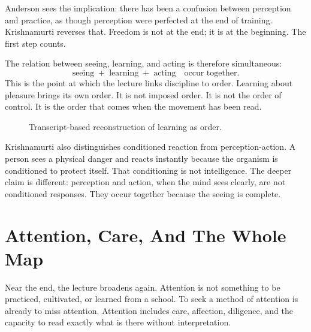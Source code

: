 Anderson sees the implication: there has been a confusion between perception and practice, as though perception were perfected at the end of training. Krishnamurti reverses that. Freedom is not at the end; it is at the beginning. The first step counts.

The relation between seeing, learning, and acting is therefore simultaneous:
\begin{equation}
\text{seeing} \;+\; \text{learning} \;+\; \text{acting}
\quad \text{occur together}.
\end{equation}
This is the point at which the lecture links discipline to order. Learning about pleasure brings its own order. It is not imposed order. It is not the order of control. It is the order that comes when the movement has been read.

\begin{figure}
\centering
{}

Transcript-based reconstruction of learning as order.
\end{figure}

Krishnamurti also distinguishes conditioned reaction from perception-action. A person sees a physical danger and reacts instantly because the organism is conditioned to protect itself. That conditioning is not intelligence. The deeper claim is different: perception and action, when the mind sees clearly, are not conditioned responses. They occur together because the seeing is complete.

\section{Attention, Care, And The Whole Map}

Near the end, the lecture broadens again. Attention is not something to be practiced, cultivated, or learned from a school. To seek a method of attention is already to miss attention. Attention includes care, affection, diligence, and the capacity to read exactly what is there without interpretation.

